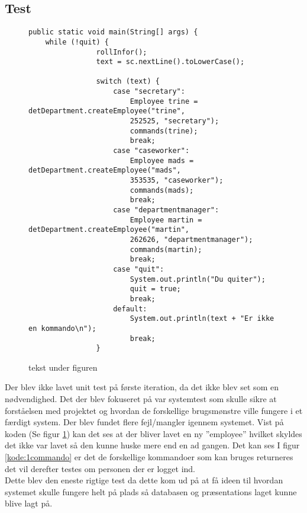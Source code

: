\subsection{Test}
\begin{figure}[hbt!]
\begin{lstlisting}
public static void main(String[] args) {
	while (!quit) {
                rollInfor();
                text = sc.nextLine().toLowerCase();

                switch (text) {
                    case "secretary":
                        Employee trine = detDepartment.createEmployee("trine", 
                        252525, "secretary");
                        commands(trine);
                        break;
                    case "caseworker":
                        Employee mads = detDepartment.createEmployee("mads", 
                        353535, "caseworker");
                        commands(mads);
                        break;
                    case "departmentmanager":
                        Employee martin = detDepartment.createEmployee("martin", 
                        262626, "departmentmanager");
                        commands(martin);
                        break;
                    case "quit":
                        System.out.println("Du quiter");
                        quit = true;
                        break;
                    default:
                        System.out.println(text + "Er ikke en kommando\n");
                        break;
                }
\end{lstlisting}
\caption{tekst under figuren}
\label{kode:1main}
\end{figure}
Der blev ikke lavet unit test på første iteration, da det ikke blev set som en nødvendighed. Det der blev fokuseret på var systemtest som skulle sikre at forståelsen med projektet og hvordan de forskellige brugsmønstre ville fungere i et færdigt system. Der blev fundet flere fejl/mangler igennem systemet. Vist på koden (Se figur \ref{kode:1main}) kan det ses at der bliver lavet en ny ”employee” hvilket skyldes det ikke var lavet så den kunne huske mere end en ad gangen. Det kan ses I figur \ref{kode:1commando} er det de forskellige kommandoer som kan bruges returneres det vil derefter testes om personen der er logget ind. \\
Dette blev den eneste rigtige test da dette kom ud på at få ideen til hvordan systemet skulle fungere helt på plads så databasen og præsentations laget kunne blive lagt på. 
